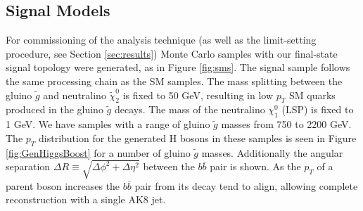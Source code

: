 \subsection{Signal Models}
\label{sec:signal-models}

For commissioning of the analysis technique (as well as the limit-setting procedure, see Section \ref{sec:results}) Monte Carlo samples with our final-state signal topology were generated, as in Figure \ref{fig:sms}. The signal sample follows the same processing chain as the SM samples. The mass splitting between the gluino $\tilde{g}$ and neutralino $\tilde{\chi}_{2}^{0}$ is fixed to 50 GeV, resulting in low $p_{T}$ SM quarks produced in the gluino $\tilde{g}$ decays. The mass of the neutralino $\chi^{0}_{1}$ (LSP) is fixed to 1 GeV. We have samples with a range of gluino $\tilde{g}$ masses from 750 to 2200 GeV. The $p_{T}$ distribution for the generated H bosons in these samples is seen in Figure \ref{fig:GenHiggsBoost} for a number of gluino $\tilde{g}$ masses. Additionally the angular separation $\Delta R \equiv \sqrt{\Delta\phi^{2}+\Delta\eta^{2}}$ between the $b\bar{b}$ pair is shown. As the $p_{T}$ of a parent boson increases the $b\bar{b}$ pair from its decay tend to align, allowing complete reconstruction with a single AK8 jet.

